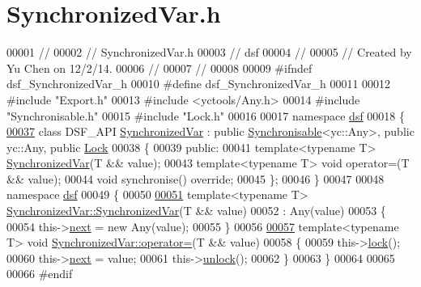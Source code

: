 \hypertarget{_synchronized_var_8h_source}{}\section{Synchronized\+Var.\+h}
\label{_synchronized_var_8h_source}

\begin{DoxyCode}
00001 \textcolor{comment}{//}
00002 \textcolor{comment}{//  SynchronizedVar.h}
00003 \textcolor{comment}{//  dsf}
00004 \textcolor{comment}{//}
00005 \textcolor{comment}{//  Created by Yu Chen on 12/2/14.}
00006 \textcolor{comment}{//}
00007 \textcolor{comment}{//}
00008 
00009 \textcolor{preprocessor}{#ifndef dsf\_SynchronizedVar\_h}
00010 \textcolor{preprocessor}{#define dsf\_SynchronizedVar\_h}
00011 
00012 \textcolor{preprocessor}{#include "Export.h"}
00013 \textcolor{preprocessor}{#include <yctools/Any.h>}
00014 \textcolor{preprocessor}{#include "Synchronisable.h"}
00015 \textcolor{preprocessor}{#include "Lock.h"}
00016 
00017 \textcolor{keyword}{namespace }\hyperlink{namespacedsf}{dsf}
00018 \{
\hypertarget{_synchronized_var_8h_source_l00037}{}\hyperlink{classdsf_1_1_synchronized_var}{00037}     \textcolor{keyword}{class }DSF\_API \hyperlink{classdsf_1_1_synchronized_var}{SynchronizedVar} : \textcolor{keyword}{public} \hyperlink{classdsf_1_1_synchronisable}{Synchronisable}<yc::Any>, \textcolor{keyword}{public} 
      yc::Any, \textcolor{keyword}{public} \hyperlink{classdsf_1_1_lock}{Lock}
00038     \{
00039     \textcolor{keyword}{public}:
00041         \textcolor{keyword}{template}<\textcolor{keyword}{typename} T> \hyperlink{classdsf_1_1_synchronized_var}{SynchronizedVar}(T && value);
00043         \textcolor{keyword}{template}<\textcolor{keyword}{typename} T> \textcolor{keywordtype}{void} operator=(T && value);
00044         \textcolor{keywordtype}{void} synchronise() \textcolor{keyword}{override};
00045     \};
00046 \}
00047 
00048 \textcolor{keyword}{namespace }\hyperlink{namespacedsf}{dsf}
00049 \{
00050     
\hypertarget{_synchronized_var_8h_source_l00051}{}\hyperlink{classdsf_1_1_synchronized_var_aada6540bf8bbbf1451834f31aad0962f}{00051}     \textcolor{keyword}{template}<\textcolor{keyword}{typename} T> \hyperlink{classdsf_1_1_synchronized_var_aada6540bf8bbbf1451834f31aad0962f}{SynchronizedVar::SynchronizedVar}(T && value)
00052     : Any(value)
00053     \{
00054         this->\hyperlink{classdsf_1_1_synchronisable_ae2434faac15d3184da1543a91e175713}{next} = \textcolor{keyword}{new} Any(value);
00055     \}
00056     
\hypertarget{_synchronized_var_8h_source_l00057}{}\hyperlink{classdsf_1_1_synchronized_var_a8b72cc04251d677755090bd9b834291c}{00057}     \textcolor{keyword}{template}<\textcolor{keyword}{typename} T> \textcolor{keywordtype}{void} \hyperlink{classdsf_1_1_synchronized_var_a8b72cc04251d677755090bd9b834291c}{SynchronizedVar::operator=}(T && value)
00058     \{
00059         this->\hyperlink{classdsf_1_1_lock_ae521388d861fe66b9c6e2f09811b0d4b}{lock}();
00060         this->\hyperlink{classdsf_1_1_synchronisable_ae2434faac15d3184da1543a91e175713}{next} = value;
00061         this->\hyperlink{classdsf_1_1_lock_a3d03f801920d458b3c3c402a0f4af323}{unlock}();
00062     \}
00063 \}
00064 
00065 
00066 \textcolor{preprocessor}{#endif}
\end{DoxyCode}
